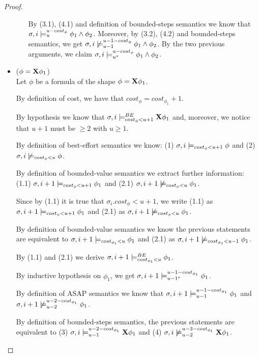 \begin{theorem}
\begin{proof}
\begin{itemize}
\begin{itemize}
        By (3.1), (4.1) and definition of bounded-steps semantics we know that $\sigma,i \models_{u}^{u-cost_\phi} \phi_1 \land \phi_2$.
        Moreover, by (3.2), (4.2) and bounded-steps semantics, we get $\sigma,i \not\models_{u-1}^{u-1-cost_\phi} \phi_1 \land \phi_2$.
        By the two previous arguments, we claim $\sigma,i \models_{{u}^*}^{u-cost_\phi} \phi_1 \land \phi_2$.
    \end{itemize}
    
    \item ($\phi = \mathbf{X} \phi_1$) \\
    Let $\phi$ be a formula of the shape $\phi = \mathbf{X} \phi_1$.
    
    By definition of cost, we have that $cost_\phi = cost_{\phi_1} + 1$.
    
    By hypothesis we know that $\sigma,i \models_{cost_\phi < u + 1}^{BE} \mathbf{X} \phi_1$ and, moreover, we notice that $u+1$ must be $\geq 2$ with $u \geq 1$.
    
    By definition of best-effort semantics we know: 
    (1) $\sigma,i \models_{cost_\phi < u + 1} \phi$ and 
    (2) $\sigma,i \not\models_{cost_\phi < u} \phi$.
    
    By definition of bounded-value semantics we extract further information: 
    (1.1) $\sigma,i+1 \models_{cost_\phi < u + 1} \phi_1$ and 
    (2.1) $\sigma,i+1 \not\models_{cost_\phi < u} \phi_1$.
    
    Since by (1.1) it is true that $\sigma_i.cost_\phi < u + 1$, we write (1.1) as $\sigma,i+1 \models_{cost_\phi < u + 1} \phi_1$ and (2.1) as $\sigma,i+1 \not\models_{cost_\phi < u} \phi_1$.
    
    By definition of bounded-value semantics we know the previous statements are equivalent to $\sigma,i+1 \models_{cost_{\phi_1} < u} \phi_1$ and (2.1) as $\sigma,i+1 \not\models_{cost_{\phi_1} < u-1} \phi_1$.
    
    By (1.1) and (2.1) we derive $\sigma,i+1 \models_{cost_{\phi_1} < u}^{BE} \phi_1$.
 
    By inductive hypothesis on $\phi_1$, we get $\sigma,i+1 \models_{{u-1}^*}^{u-1-cost_{\phi_1}} \phi_1$.
    
    By definition of ASAP semantics we know that $\sigma,i+1 \models_{u-1}^{u-1-{cost_{\phi_1}}} \phi_1$ and $\sigma,i+1 \not\models_{u-2}^{u-2-cost_{\phi_1}} \phi_1$.
    
    By definition of bounded-steps semantics, the previous statements are equivalent to (3) $\sigma,i \models_{u-1}^{u-2-cost_{\phi_1}} \mathbf{X} \phi_1$ and (4) $\sigma,i \not\models_{u-2}^{u-3-cost_{\phi_1}} \mathbf{X} \phi_1$.
    

\end{itemize}
\end{proof}
\end{theorem}
